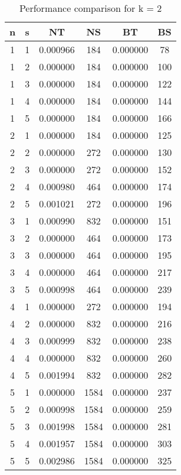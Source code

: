 \documentclass{article}
\begin{document}
    \begin{table}[ht]
    \centering
    \begin{tabular}{|c|c|c|c|c|c|}
    \hline
    n & s & NT & NS & BT & BS \\
    \hline
     1 & 1 & 0.000966 & 184 & 0.000000 & 78 \\ 
 1 & 2 & 0.000000 & 184 & 0.000000 & 100 \\ 
 1 & 3 & 0.000000 & 184 & 0.000000 & 122 \\ 
 1 & 4 & 0.000000 & 184 & 0.000000 & 144 \\ 
 1 & 5 & 0.000000 & 184 & 0.000000 & 166 \\ 
 2 & 1 & 0.000000 & 184 & 0.000000 & 125 \\ 
 2 & 2 & 0.000000 & 272 & 0.000000 & 130 \\ 
 2 & 3 & 0.000000 & 272 & 0.000000 & 152 \\ 
 2 & 4 & 0.000980 & 464 & 0.000000 & 174 \\ 
 2 & 5 & 0.001021 & 272 & 0.000000 & 196 \\ 
 3 & 1 & 0.000990 & 832 & 0.000000 & 151 \\ 
 3 & 2 & 0.000000 & 464 & 0.000000 & 173 \\ 
 3 & 3 & 0.000000 & 464 & 0.000000 & 195 \\ 
 3 & 4 & 0.000000 & 464 & 0.000000 & 217 \\ 
 3 & 5 & 0.000998 & 464 & 0.000000 & 239 \\ 
 4 & 1 & 0.000000 & 272 & 0.000000 & 194 \\ 
 4 & 2 & 0.000000 & 832 & 0.000000 & 216 \\ 
 4 & 3 & 0.000999 & 832 & 0.000000 & 238 \\ 
 4 & 4 & 0.000000 & 832 & 0.000000 & 260 \\ 
 4 & 5 & 0.001994 & 832 & 0.000000 & 282 \\ 
 5 & 1 & 0.000000 & 1584 & 0.000000 & 237 \\ 
 5 & 2 & 0.000998 & 1584 & 0.000000 & 259 \\ 
 5 & 3 & 0.001998 & 1584 & 0.000000 & 281 \\ 
 5 & 4 & 0.001957 & 1584 & 0.000000 & 303 \\ 
 5 & 5 & 0.002986 & 1584 & 0.000000 & 325 \\ 

    \hline
    \end{tabular}
    \caption{Performance comparison for k = 2}
    \end{table}
    
\end{document}
